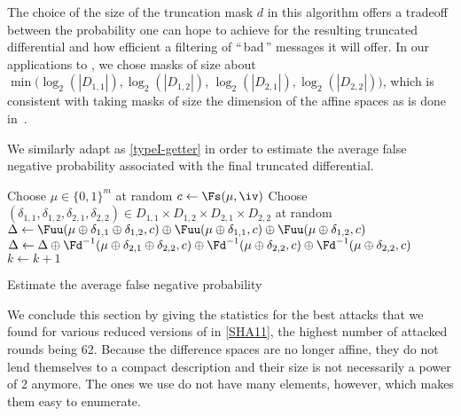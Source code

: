   The choice of the size of the truncation mask $d$ in this algorithm
  offers a tradeoff between the probability one can hope to achieve for the resulting truncated differential
  and how efficient a filtering of ``\,bad\,'' messages it will offer.
  In our applications to \shaone, we chose masks of size about
  $\min(\log_2(|D_{1,1}|), \log_2(|D_{1,2}|)$, $\log_2(|D_{2,1}|), \log_2(|D_{2,2}|))$,
  which is consistent with taking masks of size the dimension of the affine
  spaces as is done in~\cite{DBLP:conf/crypto/KnellwolfK12}.

  \medskip

  We similarly adapt \cite[Algorithm 3]{DBLP:conf/crypto/KnellwolfK12} as \autoref{typeI-getter} in order to estimate the average
  false negative probability associated with the final truncated differential.

  \begin{algorithm}[ht]
        \LinesNumbered

    {
      Choose $\mu \in \{0,1\}^m$ at random \;
      $c \leftarrow \Fs(\mu, \iv)$\;
      Choose $(\delta_{1,1},\delta_{1,2},\delta_{2,1},\delta_{2,2}) \in D_{1,1} \times D_{1,2} \times D_{2,1} \times D_{2,2} $ at random\; 
      $\Delta \leftarrow 
      \Fuu (\mu \oplus \delta_{1,1} \oplus \delta_{1,2} , c) \oplus 
      \Fuu (\mu \oplus \delta_{1,1} , c) \oplus 
      \Fuu(\mu \oplus \delta_{1,2},c)$\;
      $\Delta \leftarrow \Delta \oplus
      \Fd^{-1} (\mu \oplus \delta_{2,1} \oplus \delta_{2,2}, c) \oplus 
      \Fd^{-1}(\mu \oplus \delta_{2,2} , c) \oplus 
      \Fd^{-1} (\mu \oplus \delta_{2,2} , c) $\;
      {
        {
          $k \leftarrow k+1$\;
        }
      }
    }
    \caption{\label{typeI-getter}Estimate the average false negative probability}
  \end{algorithm}

  We conclude this section by giving the statistics for the best attacks that we found for
  various reduced versions of \shaone in \autoref{SHA11}, the highest number of
  attacked rounds being 62. Because the difference spaces
  are no longer affine, they do not lend themselves to a compact description and their size
  is not necessarily a power of 2 anymore. The ones we use do not have many elements, however,
  which makes them easy to enumerate.

